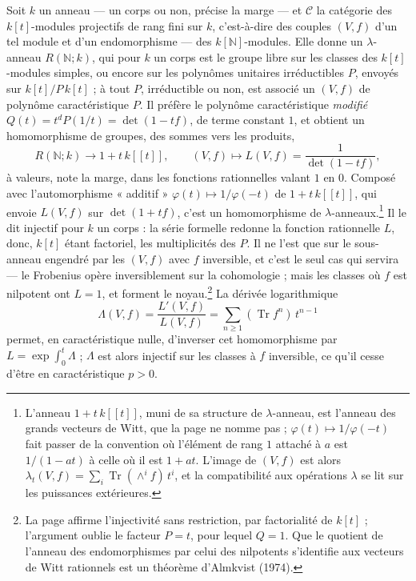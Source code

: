 \documentclass[11pt,a4paper]{article}
\begin{document}
Soit $k$ un anneau --- un corps ou non, précise la marge --- et $\mathcal{C}$ la
catégorie des $k[t]$-modules projectifs de rang fini sur $k$, c'est-à-dire des
couples $(V, f)$ d'un tel module et d'un endomorphisme --- des
$k[\mathbb{N}]$-modules. Elle donne un $\lambda$-anneau $R(\mathbb{N}; k)$, qui
pour $k$ un corps est le groupe libre sur les classes des $k[t]$-modules
simples, ou encore sur les polynômes unitaires irréductibles $P$, envoyés sur
$k[t]/P\,k[t]$ ; à tout $P$, irréductible ou non, est associé un $(V, f)$ de
polynôme caractéristique $P$. Il préfère le polynôme caractéristique
\emph{modifié} $Q(t) = t^{d}P(1/t) = \det(1 - tf)$, de terme constant $1$, et
obtient un homomorphisme de groupes, des sommes vers les produits,
\[
R(\mathbb{N}; k) \longrightarrow 1 + t\,k[[t]] ,
\qquad
(V, f) \longmapsto L(V, f) = \frac{1}{\det(1 - tf)} ,
\]
à valeurs, note la marge, dans les fonctions rationnelles valant $1$ en $0$.
Composé avec l'automorphisme « additif » $\varphi(t) \mapsto 1/\varphi(-t)$ de
$1 + t\,k[[t]]$, qui envoie $L(V, f)$ sur $\det(1 + tf)$, c'est un homomorphisme
de $\lambda$-anneaux.\footnote{L'anneau $1 + t\,k[[t]]$, muni de sa structure
de $\lambda$-anneau, est l'anneau des grands vecteurs de Witt, que la page ne
nomme pas ; $\varphi(t) \mapsto 1/\varphi(-t)$ fait passer de la convention
où l'élément de rang $1$ attaché à $a$ est $1/(1 - at)$ à celle où il est
$1 + at$. L'image de $(V, f)$ est alors $\lambda_{t}(V, f) = \sum_{i}
\operatorname{Tr}(\wedge^{i}f)\,t^{i}$, et la compatibilité aux opérations
$\lambda$ se lit sur les puissances extérieures.} Il le dit injectif pour $k$ un corps : la série formelle
redonne la fonction rationnelle $L$, donc, $k[t]$ étant factoriel, les
multiplicités des $P$. Il ne l'est que sur le sous-anneau engendré par les $(V, f)$ avec $f$
inversible, et c'est le seul cas qui servira --- le Frobenius opère
inversiblement sur la cohomologie ; mais les classes où $f$ est nilpotent ont
$L = 1$, et forment le noyau.\footnote{La page affirme l'injectivité sans
restriction, par factorialité de $k[t]$ ; l'argument oublie le facteur $P = t$,
pour lequel $Q = 1$. Que le quotient de l'anneau des endomorphismes par celui des
nilpotents s'identifie aux vecteurs de Witt rationnels est un théorème
d'Almkvist (1974).} La dérivée logarithmique
\[
\Lambda(V, f) = \frac{L'(V, f)}{L(V, f)} = \sum_{n \geqslant 1}
(\operatorname{Tr} f^{n})\, t^{n-1}
\]
permet, en caractéristique nulle, d'inverser cet homomorphisme par $L = \exp \int_{0}^{t} \Lambda$ ;
$\Lambda$ est alors injectif sur les classes à $f$ inversible, ce qu'il cesse d'être
en caractéristique $p > 0$.
\end{document}
